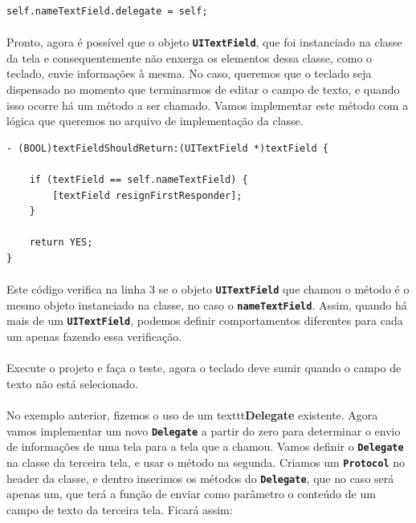 \documentclass[a4paper,12pt,brazil,doubleside]{book}
\begin{document}
\begin{listing}
\begin{verbatim}
self.nameTextField.delegate = self;
\end{verbatim}
\end{listing}

\paragraph{}Pronto, agora é possível que o objeto \texttt{\textbf{UITextField}}, que foi instanciado na classe da tela e consequentemente não enxerga os elementos dessa classe, como o teclado, envie informações à mesma. No caso, queremos que o teclado seja dispensado no momento que terminarmos de editar o campo de texto, e quando isso ocorre há um método a ser chamado. Vamos implementar este método com a lógica que queremos no arquivo de implementação da classe.

\begin{listing}
\begin{verbatim}
- (BOOL)textFieldShouldReturn:(UITextField *)textField {
    
    if (textField == self.nameTextField) {
        [textField resignFirstResponder];
    }
    
    return YES;
}
\end{verbatim}
\end{listing}

\paragraph{}Este código verifica na linha 3 se o objeto \texttt{\textbf{UITextField}} que chamou o método é o mesmo objeto instanciado na classe, no caso o \texttt{\textbf{nameTextField}}. Assim, quando há mais de um \texttt{\textbf{UITextField}}, podemos definir comportamentos diferentes para cada um apenas fazendo essa verificação.
\paragraph{}Execute o projeto e faça o teste, agora o teclado deve sumir quando o campo de texto não está selecionado.

\paragraph{}No exemplo anterior, fizemos o uso de um texttt{\textbf{Delegate}} existente. Agora vamos implementar um novo \texttt{\textbf{Delegate}} a partir do zero para determinar o envio de informações de uma tela para a tela que a chamou. Vamos definir o \texttt{\textbf{Delegate}} na classe da terceira tela, e usar o método na segunda. Criamos um \texttt{\textbf{Protocol}} no header da classe, e dentro inserimos os métodos do \texttt{\textbf{Delegate}}, que no caso será apenas um, que terá a função de enviar como parâmetro o conteúdo de um campo de texto da terceira tela. Ficará assim:
\end{document}
